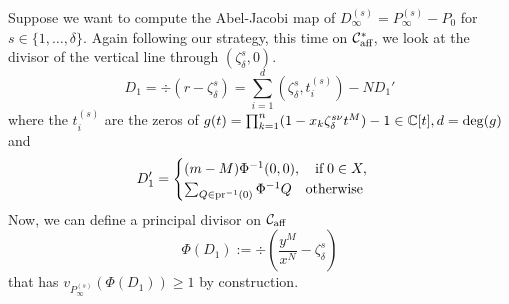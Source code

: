 \documentclass[main.tex]{subfiles}
\begin{document}
   
   Suppose we want to compute the Abel-Jacobi map of $D_{\infty}^{(s)} = P_{\infty}^{(s)} - P_0$ for $s \in \{1,\dots,\delta\}$.
   Again following our strategy,
   this time on $\mathcal{C}_{\text{aff}}^{*}$, we look at the divisor of the vertical line through $(\zeta_{\delta}^s,0)$.
   \begin{equation}
      D_1 = \div(r - \zeta_{\delta}^s) = \sum_{i = 1}^{d} \left(\zeta_{\delta}^s,t_i^{(s)}\right) - N D_1'
   \end{equation}
      where the $t_i^{(s)}$ are the zeros of $g(t) = \prod_{k=1}^n (1-x_k\zeta_{\delta}^{s\nu}t^M) - 1 \in \mathbb{C}[t], d = \operatorname{deg}(g)$ and
    \begin{equation}
       D_1' = \begin{cases}
	     (m-M) \Phi^{-1}(0,0), \quad \text{if} \; 0 \in X, \\
             \sum_{Q \in \operatorname{pr}^{-1}(0)} \Phi^{-1}Q \quad \text{otherwise}
            \end{cases}
    \end{equation}
    Now, we can define a principal divisor on $\mathcal{C}_{\text{aff}}$ 
    \begin{equation}
       \Phi(D_1) := \div \left( \frac{y^M}{x^N} - \zeta_{\delta}^s \right)
    \end{equation}
   that has $v_{P_{\infty}^{(s)}}(\Phi(D_1)) \ge 1$ by construction.
    
\end{document}
